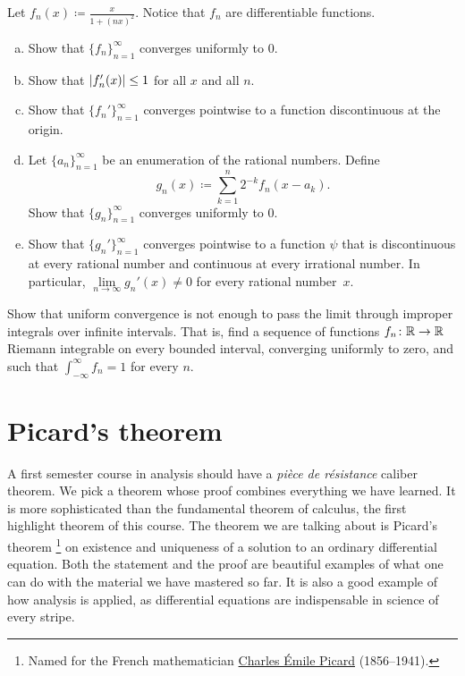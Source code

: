 \begin{exercise}
Let $f_n(x) \coloneqq \frac{x}{1+{(nx)}^2}$.  Notice that $f_n$ are differentiable
functions.
\begin{enumerate}[a)]
\item
Show that $\{ f_n \}_{n=1}^\infty$ converges uniformly to 0.
\item
Show that $\lvert {f_n'(x)} \rvert \leq 1$ for all $x$ and all $n$.
\item
Show that $\{ f_n' \}_{n=1}^\infty$ converges pointwise to a function discontinuous at
the origin.
\item
Let $\{ a_n \}_{n=1}^\infty$ be an enumeration of the rational numbers.
Define
\begin{equation*}
g_n(x) \coloneqq \sum_{k=1}^n 2^{-k} f_n(x-a_k) .
\end{equation*}
Show that $\{ g_n \}_{n=1}^\infty$ converges uniformly to 0.
\item
Show that $\{ g_n' \}_{n=1}^\infty$ converges pointwise to a function $\psi$ that
is discontinuous at every rational number and continuous at every
irrational number.  In particular, $\lim\limits_{n\to\infty} g_n'(x) \neq 0$ for
every rational number~$x$.
\end{enumerate}
\end{exercise}

\begin{exercise}
Show that uniform convergence is not enough to pass the limit through
improper integrals over infinite intervals.
That is, find a sequence of functions $f_n \colon {\mathbb{R}} \to
{\mathbb{R}}$ Riemann integrable on every bounded interval,
converging uniformly to zero, and such that
$\int_{-\infty}^\infty f_n = 1$ for every $n$.
\end{exercise}


\sectionnewpage
\section{Picard's theorem}
\label{sec:picard}



A first semester course in analysis should have
a \emph{pi\`ece de r\'esistance} caliber
theorem.  We pick a theorem whose proof combines everything we have
learned.  It is more sophisticated than the fundamental theorem of calculus,
the first highlight theorem of this course.  The
theorem we are talking about is Picard's
theorem%
\footnote{Named for the French mathematician
\href{https://en.wikipedia.org/wiki/\%C3\%89mile_Picard}{Charles \'Emile Picard}
(1856--1941).}
on existence and uniqueness of a solution to an ordinary differential equation.
Both the statement and the proof are beautiful examples of what one can do
with the material we have mastered so far.  It is also a good example of how analysis is
applied, as differential equations are indispensable in science of every
stripe.

